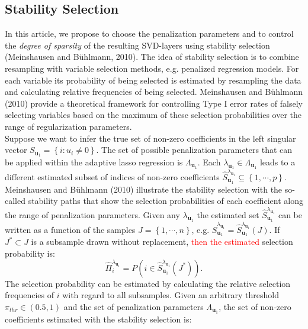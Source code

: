 \documentclass{bioinfo}
\begin{document}
\begin{methods}
\subsection{Stability Selection}
In this article, we propose to choose the penalization parameters and to control the \textit{degree of sparsity} of the resulting SVD-layers using stability selection (Meinshausen and B\"uhlmann, 2010). The idea of stability selection is to combine resampling with variable selection methods, e.g. penalized regression models. For each variable its probability of being selected is estimated by resampling the data and calculating relative frequencies of being selected. Meinshausen and B\"uhlmann (2010) provide a theoretical framework for controlling Type I error rates of falsely selecting variables based on the maximum of these selection probabilities over the range of regularization parameters. \\
Suppose we want to infer the true set of non-zero coefficients in the left singular vector $S_{\mathbf{u}_{1}}=\left\{i:u_{i} \neq 0 \right\}$. The set of possible penalization parameters that can be applied within the adaptive lasso regression is $\Lambda_{\mathbf{u}_{1}}$. Each $\lambda_{\mathbf{u}_{1}} \in \Lambda_{\mathbf{u}_{1}}$ leads to a different estimated subset of indices of non-zero coefficients $\hat{S}^{\lambda_{\mathbf{u}_{1}}}_{\mathbf{u}_{1}}\subseteq\left\{1,\cdots,p\right\}$. 
Meinshausen and B\"uhlmann (2010) illustrate the stability selection with the so-called stability paths that show the 
selection probabilities of each coefficient along the range of penalization parameters. Given any $\lambda_{\mathbf{u}_{1}}$ the estimated set $\hat{S}^{\lambda_{\mathbf{u}_{1}}}_{\mathbf{u}_{1}}$ can be written as a function of the samples $J=\left\{1,\cdots,n \right\} $, e.g. $\hat{S}^{\lambda_{\mathbf{u}_{1}}}_{\mathbf{u}_{1}}=\hat{S}^{\lambda_{\mathbf{u}_{1}}}_{\mathbf{u}_{1}}(J)$. If $J^{*} \subset J$ is a subsample drawn without replacement, \textcolor{red}{then the estimated} selection probability is:
\begin{equation}
 \hat{\Pi}_{i}^{\lambda_{\mathbf{u}_{1}}}=P(i \in \hat{S}^{\lambda_{\mathbf{u}_{1}}}_{\mathbf{u}_{1}}(J^{*})).
\end{equation}
The selection probability can be estimated by calculating the relative selection frequencies of $i$ with regard to all subsamples.
Given an arbitrary threshold $\pi_{thr} \in (0.5,1)$ and the set of penalization parameters $\Lambda_{\mathbf{u}_{1}}$, the set of non-zero coefficients estimated with the stability selection is:

\end{methods}
\end{document}
